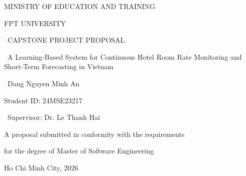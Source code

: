 \documentclass[12pt,a4paper]{report}
\begin{document}
\hypersetup{pageanchor=false}
\begin{titlepage}
    \centering
    \singlespacing          %
    \thispagestyle{empty}
    \vspace*{1cm}

    {\large MINISTRY OF EDUCATION AND TRAINING\par}
    {\large FPT UNIVERSITY\par}
    \vspace{2.5cm}

    {\Large\ CAPSTONE PROJECT PROPOSAL\par}
    \vspace{1.2cm}

    {\LARGE\ A Learning-Based System for Continuous Hotel Room Rate Monitoring and Short-Term Forecasting in Vietnam\par}
    \vspace{2cm}

    {\large\ Dang Nguyen Minh An\par}
    {\large Student ID: 24MSE23217\par}
    \vspace{1cm}

    {\large\ Supervisor: Dr. Le Thanh Hai\par}
    \vspace{2.5cm}

    {\large A proposal submitted in conformity with the requirements\par}
    {\large for the degree of Master of Software Engineering\par}
    \vspace{1.5cm}

    {\large Ho Chi Minh City, 2026\par}
\end{titlepage}
\hypersetup{pageanchor=true}




\tableofcontents
\clearpage

\listoffigures
{}
\clearpage
\end{document}
